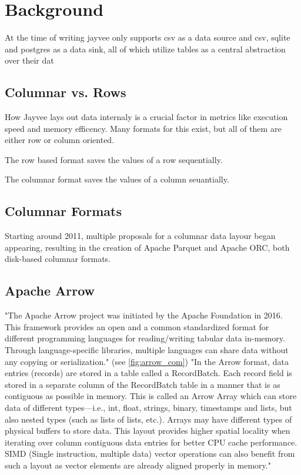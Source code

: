 \chapter{Background}
\label{chapter:Literature}

At the time of writing jayvee only supports csv as a data source and csv, sqlite and postgres as a data sink, all of which utilize tables as a central abstraction over their dat




\section{Columnar vs. Rows}
\label{section:column_vs_row}
How Jayvee lays out data internaly is a crucial factor in metrics like execution speed and memory efficency.
Many formats for this exist, but all of them are either row or column oriented.

The row based format saves the values of a row sequentially.

The columnar format saves the values of a column seuantially.

\section{Columnar Formats}
\label{section:columnar}
Starting around 2011, multiple proposals for a columnar data layour began appearing, resulting in the creation of Apache Parquet and Apache ORC, both disk-based columnar formats.

\section{Apache Arrow}
\label{section:arrow}
"The Apache Arrow project was initiated by the Apache Foundation in 2016.
This framework provides an open and a common standardized format for different programming languages for reading/writing tabular data in-memory.
Through language-specific libraries, multiple languages can share data without any copying or serialization." \autocite{Ahmad2020} (see \ref{fig:arrow_com})
"In the Arrow format, data entries (records) are stored in a table called a RecordBatch.
Each record field is stored in a separate column of the RecordBatch table in a manner that is as contiguous as possible in memory.
This is called an Arrow Array which can store data of different types—i.e., int, float, strings, binary, timestamps and lists, but also nested types (such as lists of lists, etc.).
Arrays may have different types of physical buffers to store data.
This layout provides higher spatial locality when iterating over column contiguous data entries for better CPU cache performance.
SIMD (Single instruction, multiple data) vector operations can also benefit from such a layout as vector elements are already aligned properly in memory." \autocite{Ahmad2020}

